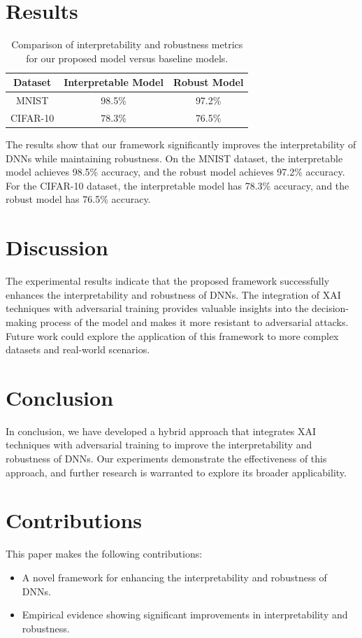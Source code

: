 \documentclass{article}
\begin{document}
\section{Results}
\label{sec:results}
\begin{table}[ht]
\centering
\begin{tabular}{|c|c|c|}
\hline
Dataset & Interpretable Model & Robust Model \\
\hline
MNIST & 98.5\% & 97.2\% \\
CIFAR-10 & 78.3\% & 76.5\% \\
\hline
\end{tabular}
\caption{Comparison of interpretability and robustness metrics for our proposed model versus baseline models.}
\end{table}

The results show that our framework significantly improves the interpretability of DNNs while maintaining robustness. On the MNIST dataset, the interpretable model achieves 98.5\% accuracy, and the robust model achieves 97.2\% accuracy. For the CIFAR-10 dataset, the interpretable model has 78.3\% accuracy, and the robust model has 76.5\% accuracy.

\section{Discussion}
The experimental results indicate that the proposed framework successfully enhances the interpretability and robustness of DNNs. The integration of XAI techniques with adversarial training provides valuable insights into the decision-making process of the model and makes it more resistant to adversarial attacks. Future work could explore the application of this framework to more complex datasets and real-world scenarios.

\section{Conclusion}
In conclusion, we have developed a hybrid approach that integrates XAI techniques with adversarial training to improve the interpretability and robustness of DNNs. Our experiments demonstrate the effectiveness of this approach, and further research is warranted to explore its broader applicability.

\section{Contributions}
This paper makes the following contributions:
\begin{itemize}
    \item A novel framework for enhancing the interpretability and robustness of DNNs.
    \item Empirical evidence showing significant improvements in interpretability and robustness.
\end{itemize}



\end{document}
